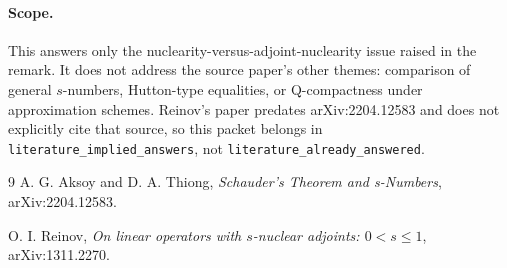 \documentclass[11pt]{article}
\begin{document}
\paragraph{Scope.}
This answers only the nuclearity-versus-adjoint-nuclearity issue raised in the
remark.  It does not address the source paper's other themes: comparison of
general \(s\)-numbers, Hutton-type equalities, or Q-compactness under
approximation schemes.  Reinov's paper predates arXiv:2204.12583 and does not
explicitly cite that source, so this packet belongs in
\texttt{literature\_implied\_answers}, not \texttt{literature\_already\_answered}.

\begin{thebibliography}{9}
A. G. Aksoy and D. A. Thiong,
\emph{Schauder's Theorem and s-Numbers},
arXiv:2204.12583.

O. I. Reinov,
\emph{On linear operators with \(s\)-nuclear adjoints: \(0<s\le 1\)},
arXiv:1311.2270.
\end{thebibliography}
\end{document}
